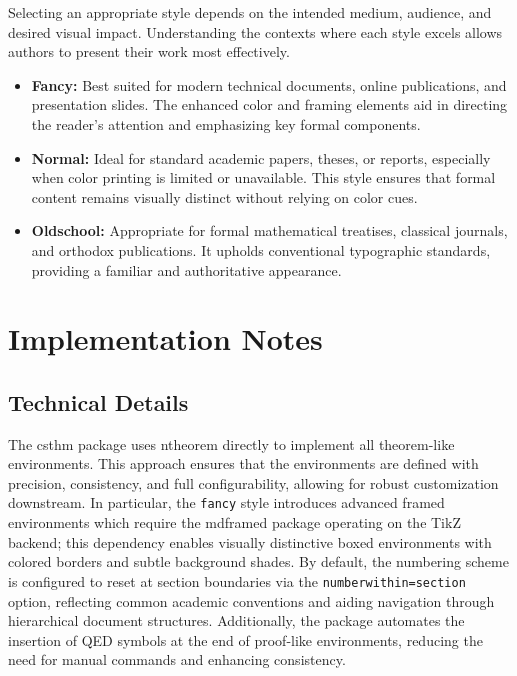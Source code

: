 \documentclass[10pt,letterpaper]{amsart}
\begin{document}
Selecting an appropriate style depends on the intended medium, audience, and
desired visual impact. Understanding the contexts where each style excels
allows authors to present their work most effectively.

\begin{itemize}[label={--}]
	\item \textbf{Fancy:} Best suited for modern technical documents, online publications, and presentation slides. The enhanced color and framing elements aid in directing the reader's attention and emphasizing key formal components.
	\item \textbf{Normal:} Ideal for standard academic papers, theses, or reports, especially when color printing is limited or unavailable. This style ensures that formal content remains visually distinct without relying on color cues.
	\item \textbf{Oldschool:} Appropriate for formal mathematical treatises, classical journals, and orthodox publications. It upholds conventional typographic standards, providing a familiar and authoritative appearance.
\end{itemize}

\section{Implementation Notes}

\subsection{Technical Details}

The \textsf{csthm} package uses \textsf{ntheorem} directly to implement all theorem-like environments. This approach ensures that
the environments are defined with precision, consistency, and full
configurability, allowing for robust customization downstream. In particular,
the \texttt{fancy} style introduces advanced framed environments which require
the \textsf{mdframed} package operating on the \textsf{TikZ} backend; this
dependency enables visually distinctive boxed environments with colored borders
and subtle background shades. By default, the numbering scheme is configured to
reset at section boundaries via the \texttt{numberwithin=section} option,
reflecting common academic conventions and aiding navigation through
hierarchical document structures. Additionally, the package automates the
insertion of QED symbols at the end of proof-like environments, reducing the
need for manual commands and enhancing consistency.
\end{document}
